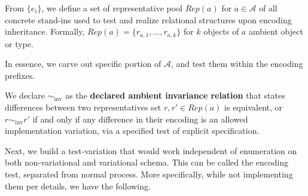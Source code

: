 \begin{definition}
	From $\{e_i\}$, we define a set of representative pool $Rep(a)$ for $a\in\mathcal{A}$ of all concrete stand-ins used to test and realize relational structures upon encoding inheritance. Formally, $Rep(a)=\{r_{a,1},\dots,r_{a,k}\}$ for $k$ objects of $a$ ambient object or type. 
\end{definition}
In essence, we carve out specific portion of $\mathcal{A}$, and test them within the encoding prefixes. 
\begin{definition}
	We declare $\sim_{\mathrm{inv}}$ as the \textbf{declared ambient invariance relation} that states differences between two representatives set $r,r'\in Rep(a)$ is equivalent, or $r \sim_{\mathrm{inv}}r'$ if and only if any difference in their encoding is an allowed implementation variation, via a specified test of explicit specification. 
\end{definition}

Next, we build a test-variation that would work independent of enumeration on both non-variational and variational schema. This can be called the encoding test, separated from normal process. More specifically, while not implementing them per details, we have the following.

